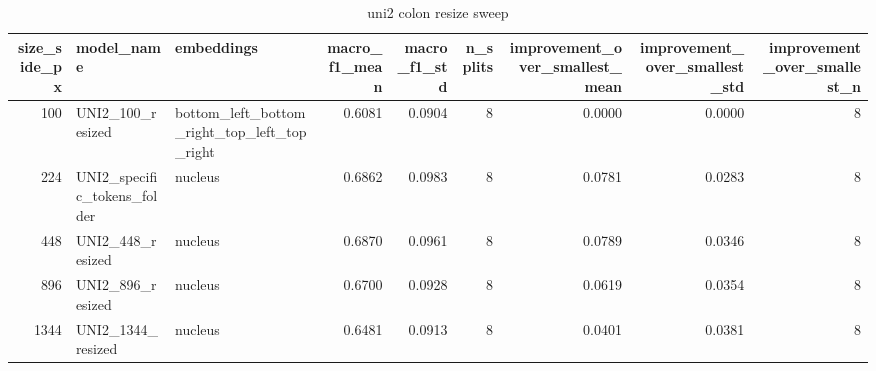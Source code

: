\begin{table}
\caption{uni2 colon resize sweep}
\label{tab:uni2_colon_resize_sweep}
\begin{tabular}{rllrrrrrr}
\toprule
size_side_px & model_name & embeddings & macro_f1_mean & macro_f1_std & n_splits & improvement_over_smallest_mean & improvement_over_smallest_std & improvement_over_smallest_n \\
\midrule
100 & UNI2_100_resized & bottom_left_bottom_right_top_left_top_right & 0.6081 & 0.0904 & 8 & 0.0000 & 0.0000 & 8 \\
224 & UNI2_specific_tokens_folder & nucleus & 0.6862 & 0.0983 & 8 & 0.0781 & 0.0283 & 8 \\
448 & UNI2_448_resized & nucleus & 0.6870 & 0.0961 & 8 & 0.0789 & 0.0346 & 8 \\
896 & UNI2_896_resized & nucleus & 0.6700 & 0.0928 & 8 & 0.0619 & 0.0354 & 8 \\
1344 & UNI2_1344_resized & nucleus & 0.6481 & 0.0913 & 8 & 0.0401 & 0.0381 & 8 \\
\bottomrule
\end{tabular}
\end{table}

